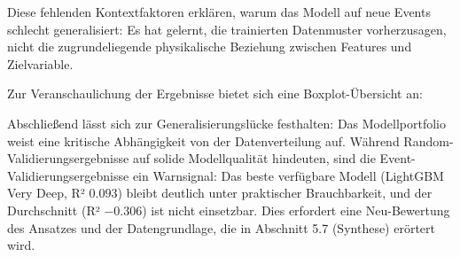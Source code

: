 Diese fehlenden Kontextfaktoren erklären, warum das Modell auf neue Events schlecht generalisiert: Es hat gelernt, die trainierten Datenmuster vorherzusagen, nicht die zugrundeliegende physikalische Beziehung zwischen Features und Zielvariable.

Zur Veranschaulichung der Ergebnisse bietet sich eine Boxplot-Übersicht an:

Abschließend lässt sich zur Generalisierungslücke festhalten:
Das Modellportfolio weist eine kritische Abhängigkeit von der Datenverteilung auf. Während Random-Validierungsergebnisse auf solide Modellqualität hindeuten, sind die Event-Validierungsergebnisse ein Warnsignal: Das beste verfügbare Modell (LightGBM Very Deep, R² $0.093$) bleibt deutlich unter praktischer Brauchbarkeit, und der Durchschnitt (R² $-0.306$) ist nicht einsetzbar. Dies erfordert eine Neu-Bewertung des Ansatzes und der Datengrundlage, die in Abschnitt 5.7 (Synthese) erörtert wird.